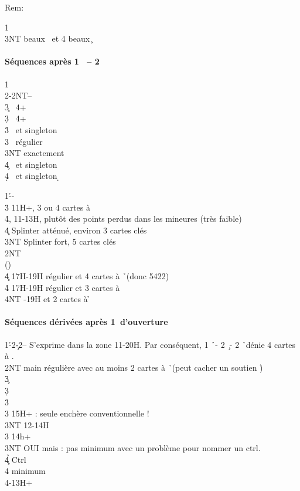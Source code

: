 \documentclass[a4paper]{article}
\begin{document}
Rem:

\begin{bidtable}
1\c\\
3NT  beaux \s\ et 4 beaux \c 
\end{bidtable}

\paragraph{Séquences après 1 \pdfs\ – 2 \pdfh}

\begin{bidtable}
1\h\\
2\s-2NT--\\
3\c {} \s\ 4+ \c \\
3\d {} \s\ 4+ \d \\
3\h {} \s\ et singleton \h \\
3\s {} \s\ régulier\\
3NT  exactement\\
4\c {} \s\ et singleton \c \\
4\d {} \s\ et singleton \d 
\end{bidtable}

\begin{bidtable}
1\h--\\
3\h \> 11H+, 3 ou 4 cartes à \h \\
4\h {}, 11-13H, plutôt des points perdus dans les mineures (très faible)\\
4\c\d \> Splinter atténué, environ 3 cartes clés\\
3NT \> Splinter fort, 5 cartes clés\\
2NT\+\\
()\+\\
4\c\d \> 17H-19H régulier et 4 cartes à \h\ (donc 5422)\\
4\h \> 17H-19H régulier et 3 cartes à \h \\
4NT -19H et 2 cartes à \h \-\-
\end{bidtable}

\paragraph{Séquences dérivées après 1\pdfh\ d’ouverture}

\begin{bidtable}
1\h-2\c-2\s-- \> S’exprime dans la zone 11-20H. Par conséquent, 1 \h\ - 2 \c\ - 2 \h\ dénie 4 cartes à \s .\\
2NT \> main régulière avec au moins 2 cartes à \h\ (peut cacher un soutien \h )\+\\
3\c {}\\
3\d {}\\
3\h {}\\
3\s {} 15H+ : seule enchère conventionnelle !\\
3NT  12-14H\-\\
3\s \> 14h+\+\\
3NT \> OUI mais : pas minimum avec un problème pour nommer un ctrl.\\
4\c\d\h \> Ctrl\\
4\s \> minimum\-\\
4\s {}-13H+
\end{bidtable}
\end{document}
